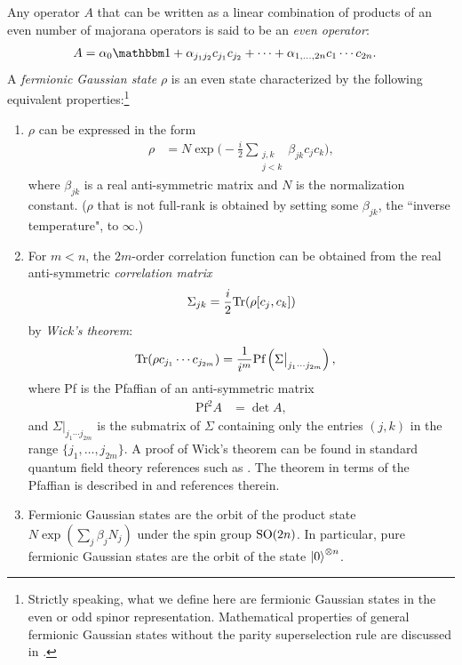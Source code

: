 Any operator $A$ that can be written as a linear combination of products of an even number of majorana operators is said to be an \emph{even operator}:
\begin{align}
	A &= \alpha_0 \id + \alpha_{j_1j_2} c_{j_1} c_{j_2} + \cdots + \alpha_{1,\dots,2n} c_1 \cdots c_{2n}.
\end{align}
A \emph{fermionic Gaussian state} $\rho$ is an even state characterized by the following equivalent properties:\footnote{Strictly speaking, what we define here are fermionic Gaussian states in the even or odd spinor representation. Mathematical properties of general fermionic Gaussian states without the parity superselection rule are discussed in \cite{oeckl_coherent_2015}.}
\begin{enumerate}
	\item $\rho$ can be expressed in the form
	\begin{align}\label{def:fermion-gaussian-state}
		\rho &= N \exp\!\Bigg(-\frac{i}{2}\sum_{\substack{j,k \\ j<k}} \beta_{jk} c_jc_k\Bigg),
	\end{align}
	where $\beta_{jk}$ is a real anti-symmetric matrix and $N$ is the normalization constant. ($\rho$ that is not full-rank is obtained by setting some $\beta_{jk}$, the ``inverse temperature", to $\infty$.)
	\item For $m<n$, the $2m$-order correlation function can be obtained from the real anti-symmetric \emph{correlation matrix}
	\begin{align}\label{def:correlation-matrix}
		\Sigma_{jk} = \frac{i}{2} \Tr (\rho [c_j,c_k])
	\end{align}
	by \emph{Wick's theorem}:
	\begin{align}\label{thm:wick}
		\Tr (\rho c_{j_1} \cdots c_{j_{2m}}) &= \frac{1}{i^m} \text{Pf}\left( \Sigma\bigr|_{j_1 \cdots j_{2m}} \right),
	\end{align}
	where Pf is the Pfaffian of an anti-symmetric matrix
	\begin{align}
		\text{Pf}^2 A &= \det A,
	\end{align}
	and $\Sigma\bigr|_{j_1 \cdots j_{2m}}$ is the submatrix of $\Sigma$ containing only the entries $(j,k)$ in the range $\{ j_1,\dots,j_{2m} \}$. A proof of Wick's theorem can be found in standard quantum field theory references such as \cite{Peskin}. The theorem in terms of the Pfaffian is described in \cite{terhal_classical_2002} and references therein.
	\item Fermionic Gaussian states are the orbit of the product state $N \exp(\sum_j \beta_j N_j)$ under the spin group $\text{SO}(2n)$. In particular, pure fermionic Gaussian states are the orbit of the state ${\left\vert{0}\right\rangle}^{\otimes n}$.
\end{enumerate}
